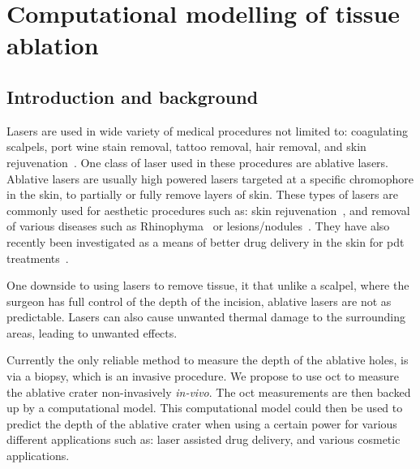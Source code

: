 \chapter{Computational modelling of tissue ablation}
\section{Introduction and background}%
Lasers are used in wide variety of medical procedures not limited to: coagulating scalpels, port wine stain removal, tattoo removal, hair removal, and skin rejuvenation~\cite{amini2010ultrafast, tan1989treatment,kuperman2001laser,liew2002laser,hardaway2002nonablative}.
One class of laser used in these procedures are ablative lasers. Ablative lasers are usually high powered lasers targeted at a specific chromophore in the skin, to partially or fully remove layers of skin. These types of lasers are commonly used for aesthetic procedures such as: skin rejuvenation~\cite{hardaway2002nonablative}, and removal of various diseases such as Rhinophyma~\cite{shapshay1980removal} or lesions/nodules~\cite{valcavi2010percutaneous}. They have also recently been investigated as a means of better drug delivery in the skin for \gls{pdt} treatments~\cite{haedersdal2010fractional}.

One downside to using lasers to remove tissue, it that unlike a scalpel, where the surgeon has full control of the depth of the incision, ablative lasers are not as predictable. Lasers can also cause  unwanted thermal damage to the surrounding areas, leading to unwanted effects.

 Currently the only reliable method to measure the depth of the ablative holes, is via a biopsy, which is an invasive procedure. We propose to use \gls{oct} to measure the ablative crater non-invasively \textit{in-vivo}. The \gls{oct} measurements are then backed up by a computational model. This computational model could then be used to predict the depth of the ablative crater when using a certain power for various different applications such as: laser assisted drug delivery, and various cosmetic applications.

